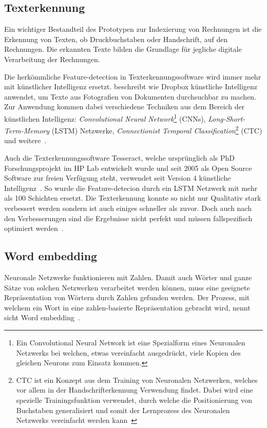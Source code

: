 \subsection{Texterkennung}

Ein wichtiger Bestandteil des Prototypen zur Indexierung von Rechnungen ist die Erkennung von Texten, ob Druckbuchstaben oder Handschrift, auf den Rechnungen. Die erkannten Texte bilden die Grundlage für jegliche digitale Verarbeitung der Rechnungen.

Die herkömmliche Feature-detection in Texterkennungssoftware wird immer mehr mit künstlicher Intelligenz ersetzt. \textcite{Neuberg2017} beschreibt wie Dropbox künstliche Intelligenz anwendet, um Texte aus Fotografien von Dokumenten durchsuchbar zu machen. Zur Anwendung kommen dabei verschiedene Techniken aus dem Bereich der künstlichen Intelligenz: \textit{Convolutional Neural Network}\footnote{Ein Convolutional Neural Network ist eine Spezialform eines Neuronalen Netzwerks bei welchen, etwas vereinfacht ausgedrückt, viele Kopien des gleichen Neurons zum Einsatz kommen\autocite{Olah2014}.} (CNNs),  \textit{Long-Short-Term-Memory} (LSTM) Netzwerke, \textit{Connectionist Temporal Classification}\footnote{CTC ist ein Konzept aus dem Training von Neuronalen Netzwerken, welches vor allem in der Handschrifterkennung Verwendung findet. Dabei wird eine spezielle Trainingsfunktion verwendet, durch welche die Positionierung von Buchstaben generalisiert und somit der Lernprozess des Neuronalen Netzwerks vereinfacht werden kann~\autocite{Scheidl2018}} (CTC) und weitere~\autocite{Neuberg2017}.

Auch die Texterkennungssoftware Tesseract, welche ursprünglich als PhD Forschungsprojekt im HP Lab entwickelt wurde und seit 2005 als Open Source Software zur freien Verfügung steht, verwendet seit Version 4 künstliche Intelligenz~\autocite{Smith2007}. So wurde die Feature-detecion durch ein LSTM Netzwerk mit mehr als 100 Schichten ersetzt. Die Texterkennung konnte so nicht nur Qualitativ stark verbessert werden sondern ist auch einiges schneller als zuvor. Doch auch nach den Verbesserungen sind die Ergebnisse nicht perfekt und müssen fallspezifisch optimiert werden~\autocite{O.V.2018, O.V.2018a}.

\subsection{Word embedding}
\label{chap:embedding}

Neuronale Netzwerke funktionieren mit Zahlen. Damit auch Wörter und ganze Sätze von solchen Netzwerken verarbeitet werden können, muss eine geeignete Repräsentation von Wörtern durch Zahlen gefunden werden. Der Prozess, mit welchem ein Wort in eine zahlen-basierte Repräsentation gebracht wird, nennt sicht Word embedding~\autocite{Olah2014b}.

